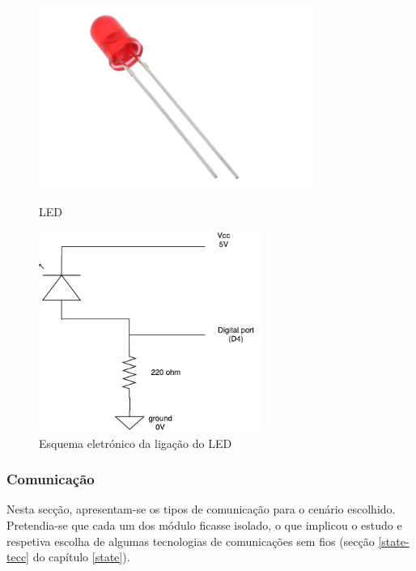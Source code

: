 \begin{figure}[h]
	\centering
	\begin{minipage}[b]{0.49\textwidth}
		\centering
		\includegraphics[width=0.8\textwidth]{img/hardware/led.jpg}
		\caption{\ac{LED}}
	\end{minipage}
	\hfill
	\begin{minipage}[b]{0.49\textwidth}
		\centering
		\includegraphics[width=0.65\textwidth]{img/hardware/led_esquema.pdf}
		\caption{Esquema eletrónico da ligação do \ac{LED}}
		\label{ligacao}
	\end{minipage}
\end{figure}



\subsubsection{Comunicação}

Nesta secção, apresentam-se os tipos de comunicação para o cenário escolhido. Pretendia-se que cada um dos módulo ficasse isolado, o que implicou o estudo e respetiva escolha de algumas tecnologias de comunicações sem fios (secção \ref{state-tecc} do capítulo \ref{state}). 

